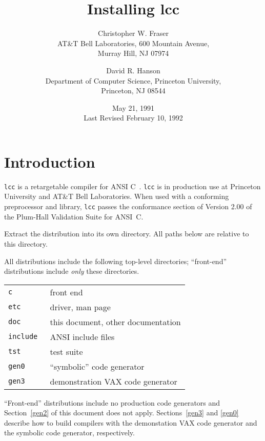 
\title{Installing lcc}

\author{Christopher W. Fraser\\
AT\&T Bell Laboratories, 600 Mountain Avenue,\\
Murray Hill, NJ 07974
\and
David R. Hanson\\
Department of Computer Science, Princeton University,\\
Princeton, NJ 08544}

\date{May 21, 1991\\ Last Revised February 10, 1992}




\maketitle

\section{Introduction}

\verb|lcc| is a retargetable compiler for ANSI C~\cite{ansi:Cstandard}.
\verb|lcc| is in production use
at Princeton University and AT\&T Bell Laboratories.
When used with a conforming preprocessor and library,
\verb|lcc| passes the conformance section of Version 2.00 of the Plum-Hall
Validation Suite for ANSI~C.

Extract the distribution into its own directory.
All paths below are relative to this directory.

All distributions include the following top-level directories;
``front-end'' distributions include {\em only} these directories.

\begin{center}
\begin{tabular}{ll}
\tt c		& front end \\
\tt etc		& driver, man page \\
\tt doc		& this document, other documentation \\
\tt include	& ANSI include files \\
\tt tst		& test suite \\
\tt gen0	& ``symbolic'' code generator \\
\tt gen3	& demonstration VAX code generator \\
\end{tabular}
\end{center}
``Front-end'' distributions include no production code generators
and Section~\ref{gen2} of this document does not apply.
Sections~\ref{gen3} and \ref{gen0} describe how to build compilers
with the demonstation VAX code generator and
the symbolic code generator, respectively.

